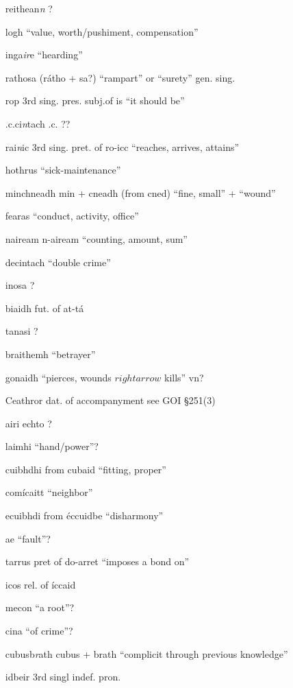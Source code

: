 \documentclass[11pt]{article}
\begin{document}
\begin{enumerate}
  \item[reithean\emph{n}] ?
  \item[logh] \enquote{value, worth/pushiment, compensation}
  \item[inga\emph{ir}e] \enquote{hearding}
  \item[rathosa] (r\'{a}tho + sa?) \enquote{rampart} or \enquote{surety} gen. sing.
  \item[rop] 3rd sing. pres. subj.of is \enquote{it should be}
  \item[.c.ci\emph{n}tach] .c. ??
  \item[rai\emph{n}ic] 3rd sing. pret. of ro-icc \enquote{reaches, arrives, attains}
  \item[hothrus] \enquote{sick-maintenance}
  \item[minchneadh] min + cneadh (from cned) \enquote{fine, small} + \enquote{wound}
  \item[fearas] \enquote{conduct, activity, office}
  \item[naiream] n-aiream \enquote{counting, amount, sum}
  \item[decintach] \enquote{double crime}
  \item[inosa] ?
  \item[biaidh] fut. of at-t\'{a}
  \item[tanasi] ?
  \item[braithemh] \enquote{betrayer}
  \item[gonaidh] \enquote{pierces, wounds $rightarrow$ kills} vn?
  \item[Ceathror] dat. of accompanyment see GOI \S 251(3)
  \item[airi echto] ?
  \item[laimhi]  \enquote{hand/power}?
  \item[cuibhdhi] from cubaid \enquote{fitting, proper}
  \item[com\'{i}caitt] \enquote{neighbor}
  \item[ecuibhdi] from \'{e}ccuidbe \enquote{disharmony}
  \item[ae] \enquote{fault}?
  \item[tarrus] pret of do-arret \enquote{imposes a bond on}
  \item[icos] rel. of \'{i}ccaid
  \item[mecon] \enquote{a root}?
  \item[cina] \enquote{of crime}?
  \item[cubusb\emph{r}ath] cubus + brath \enquote{complicit through previous knowledge}
  \item[idbeir] 3rd singl indef. pron. 

\end{enumerate}
\end{document}
